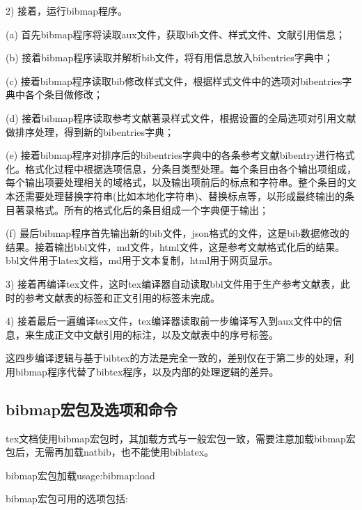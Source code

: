 \documentclass{article}
\begin{document}
2)  接着，运行bibmap程序。

(a) 首先bibmap程序将读取aux文件，获取bib文件、样式文件、文献引用信息；

(b) 接着bibmap程序读取并解析bib文件，将有用信息放入bibentries字典中；

(c) 接着bibmap程序读取bib修改样式文件，根据样式文件中的选项对bibentries字典中各个条目做修改；

(d) 接着bibmap程序读取参考文献著录样式文件，根据设置的全局选项对引用文献做排序处理，得到新的bibentries字典；

(e) 接着bibmap程序对排序后的bibentries字典中的各条参考文献bibentry进行格式化。格式化过程中根据选项信息，分条目类型处理。每个条目由各个输出项组成，每个输出项要处理相关的域格式，以及输出项前后的标点和字符串。整个条目的文本还需要处理替换字符串(比如本地化字符串)、替换标点等，以形成最终输出的条目著录格式。所有的格式化后的条目组成一个字典便于输出；

(f) 最后bibmap程序首先输出新的bib文件，json格式的文件，这是bib数据修改的结果。接着输出bbl文件，md文件，html文件，这是参考文献格式化后的结果。bbl文件用于latex文档，md用于文本复制，html用于网页显示。

3) 接着再编译tex文件，这时tex编译器自动读取bbl文件用于生产参考文献表，此时的参考文献表的标签和正文引用的标签未完成。

4)  接着最后一遍编译tex文件，tex编译器读取前一步编译写入到aux文件中的信息，来生成正文中文献引用的标注，以及文献表中的序号标签。

这四步编译逻辑与基于bibtex的方法是完全一致的，差别仅在于第二步的处理，利用bibmap程序代替了bibtex程序，以及内部的处理逻辑的差异。



\subsection{bibmap宏包及选项和命令}\label{sec:bm:opt}
tex文档使用bibmap宏包时，其加载方式与一般宏包一致，需要注意加载bibmap宏包后，无需再加载natbib，也不能使用biblatex。

\begin{example}{bibmap宏包加载}{usage:bibmap:load}
\begin{texlist}
\usepackage{bibmap}
\end{texlist}
\end{example}

bibmap宏包可用的选项包括:
\end{document}
